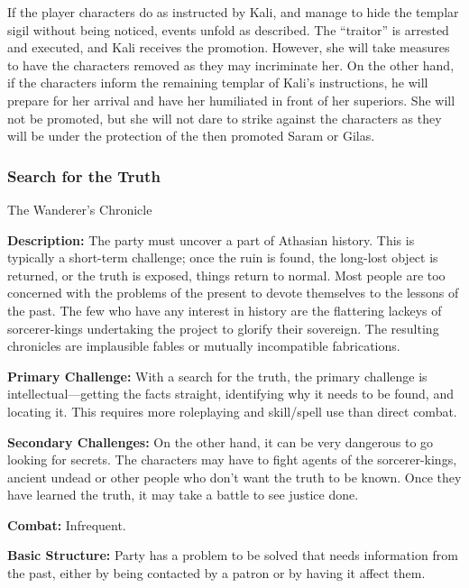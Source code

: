 If the player characters do as instructed by Kali, and manage to hide the templar sigil without being noticed, events unfold as described. The ``traitor'' is arrested and executed, and Kali receives the promotion. However, she will take measures to have the characters removed as they may incriminate her. On the other hand, if the characters inform the remaining templar of Kali's instructions, he will prepare for her arrival and have her humiliated in front of her superiors. She will not be promoted, but she will not dare to strike against the characters as they will be under the protection of the then promoted Saram or Gilas.

\subsubsection{Search for the Truth}
{The Wanderer's Chronicle}

\textbf{Description:} The party must uncover a part of Athasian history. This is typically a short-term challenge; once the ruin is found, the long-lost object is returned, or the truth is exposed, things return to normal. Most people are too concerned with the problems of the present to devote themselves to the lessons of the past. The few who have any interest in history are the flattering lackeys of sorcerer-kings undertaking the project to glorify their sovereign. The resulting chronicles are implausible fables or mutually incompatible fabrications.

\textbf{Primary Challenge:} With a search for the truth, the primary challenge is intellectual---getting the facts straight, identifying why it needs to be found, and locating it. This requires more roleplaying and skill/spell use than direct combat.

\textbf{Secondary Challenges:} On the other hand, it can be very dangerous to go looking for secrets. The characters may have to fight agents of the sorcerer-kings, ancient undead or other people who don't want the truth to be known. Once they have learned the truth, it may take a battle to see justice done.

\textbf{Combat:} Infrequent.

\textbf{Basic Structure:} Party has a problem to be solved that needs information from the past, either by being contacted by a patron or by having it affect them.

